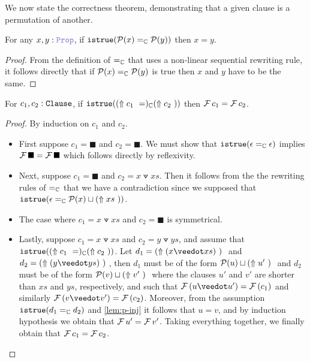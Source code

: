 We now state the correctness theorem, demonstrating that a given clause is a permutation of another.

\begin{lemma}[P-injective]\label{lem:p-inj}
For any $x, y: \prop$, if $\kw{istrue}(\cal{P}(x) =_{\bb{C}} \cal{P}(y))$ then $x = y$.
\begin{proof}
From the definition of $=_{\bb{C}}$ that uses a non-linear sequential rewriting rule,
it follows directly that if $\cal{P}(x) =_{\bb{C}} \cal{P}(y)$ is true then $x$ and $y$ have to be the same.
\end{proof}
\end{lemma}


\begin{theorem}[Correctness]\label{lem:eq-C}
For $c_1, c_2 : \tt{Clause}$, if $\tt{istrue} (\reify{c_1} =_{\bb{C}} \reify{c_2})$ then $\cal{F}\,c_1 = \cal{F}\,c_2$.
\end{theorem}
\begin{proof}
By induction on $c_1$ and $c_2$.
\begin{itemize}
  \item First suppose $c_1 = \blacksquare$ and $c_2 = \blacksquare$. We must show that $\tt{istrue} (\epsilon =_{\bb{C}} \epsilon)$ implies $\cal{F}\, \blacksquare = \cal{F}\, \blacksquare$ which follows directly by reflexivity.
  \item Next, suppose $c_1 = \blacksquare$ and $c_2 = x \veedot xs$. Then it follows from the the rewriting rules of $=_{\bb{C}}$ that we have a contradiction since we supposed that $\tt{istrue}(\epsilon =_{\bb{C}} \cal{P}(x) \sqcup \reify{xs})$.
  \item The case where $c_1 = x \veedot xs$ and $c_2 = \blacksquare$ is symmetrical.
  \item Lastly, suppose $c_1 = x \veedot xs$ and $c_2 = y \veedot ys$, and
  assume that $\tt{istrue}(\reify{c_1} =_{\bb{C}} \reify{c_2})$. 
  Let $d_1 = \reify{(x \veedot xs)}$ and $d_2 = \reify{(y \veedot ys)}$, then $d_1$ must be of the form 
  $\cal{P}(u) \sqcup \reify{u'}$ and $d_2$ must be of the form $\cal{P}(v) \sqcup \reify{v'}$ where 
  the clauses $u'$ and $v'$ are shorter than $xs$ and $ys$, respectively, and such that 
  $\cal{F}\,(u \veedot u') = \cal{F}\,(c_1)$ and similarly
  $\cal{F}\,(v \veedot v') = \cal{F}\,(c_2)$.
  Moreover, from the assumption $\tt{istrue}(d_1 =_{\bb{C}} d_2)$ and \cref{lem:p-inj} it follows that 
  $u = v$, and by induction hypothesis we obtain that $\cal{F}\,u' = \cal{F}\,v'$. Taking everything
  together, we finally obtain that $\cal{F}\,c_1 = \cal{F}\,c_2$.
\end{itemize}
\end{proof}

